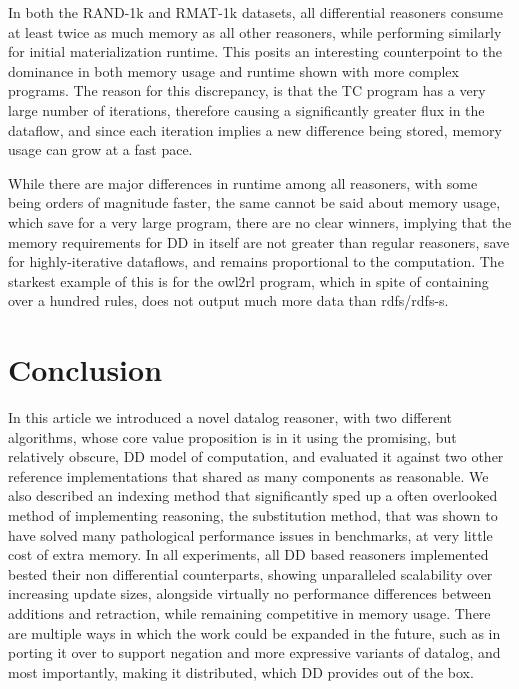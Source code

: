 \documentclass[sigconf,screen,review,natbib]{acmart}
\theoremstyle{definition}
\begin{document}
In both the RAND-1k and RMAT-1k datasets, all differential reasoners consume at least twice as much memory as all other reasoners, while performing similarly for initial
materialization runtime. This posits an interesting counterpoint to the dominance in both memory usage and runtime shown with more complex programs. The reason for this
discrepancy, is that the TC program has a very large number of iterations, therefore causing a significantly greater flux in the dataflow, and since each iteration implies
a new difference being stored, memory usage can grow at a fast pace.

While there are major differences in runtime among all reasoners, with some being orders of magnitude faster, the same cannot be said about memory usage, which save for a
very large program, there are no clear winners, implying that the memory requirements for DD in itself are not greater than regular reasoners, save for
highly-iterative dataflows, and remains proportional to the computation. The starkest example of this is for the owl2rl program, which in spite of containing over a hundred
rules, does not output much more data than rdfs/rdfs-s.
\section{Conclusion}
In this article we introduced a novel datalog reasoner, with two different algorithms, whose core value proposition is in it using the promising, but relatively obscure,
DD model of computation, and evaluated it against two other reference implementations that shared as many components as reasonable. We also described an
indexing method that significantly sped up a often overlooked method of implementing reasoning, the substitution method, that was shown to have solved many pathological
performance issues in benchmarks, at very little cost of extra memory. In all experiments, all DD based reasoners implemented bested their non differential
counterparts, showing unparalleled scalability over increasing update sizes, alongside virtually no performance differences between additions and retraction, while remaining
competitive in memory usage. There are multiple ways in which the work could be expanded in the future, such as in porting it over to support negation and more expressive
variants of datalog, and most importantly, making it distributed, which DD provides out of the box.




\appendix
\end{document}
